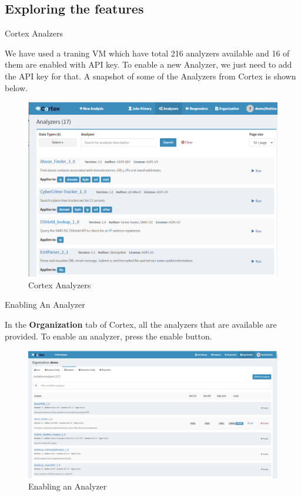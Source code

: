 \subsection{Exploring the features}
\begin{frame}{Cortex Analzers}
\begin{justify}
    We have used a traning VM which have total 216 analyzers available and 16 of them are enabled with API key. To enable a new Analyzer, we just need to add the API key for that. A snapshot of some of the Analyzers from Cortex is shown below.
\end{justify}

\begin{figure}[htp]
    \centering
    \includegraphics[scale = 0.28]{Cortex Analyzers.png}
    \caption{Cortex Analyzers}
    \label{fig:cortex-analyzers}
\end{figure}
    
\end{frame}

\begin{frame}{Enabling An Analyzer}
\begin{justify}
    In the \textbf{Organization} tab of Cortex, all the analyzers that are available are provided. To enable an analyzer, press the enable button.
\end{justify}
    \begin{figure}[htp]
    \centering
    \includegraphics[scale = 0.35]{enabling an analyzer.png}
    \caption{Enabling an Analyzer}
    \label{fig:enabling-an-analyzer}
\end{figure}
\end{frame}

